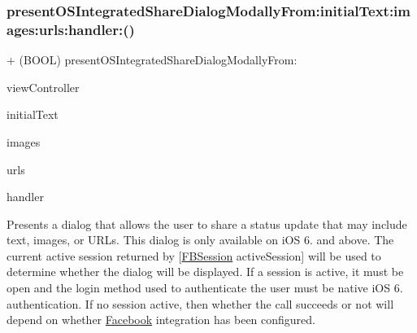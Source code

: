 \subsubsection{\texorpdfstring{present\+O\+S\+Integrated\+Share\+Dialog\+Modally\+From\+:initial\+Text\+:images\+:urls\+:handler\+:()}{presentOSIntegratedShareDialogModallyFrom:initialText:images:urls:handler:()}\hspace{0.1cm}{\footnotesize\ttfamily [2/5]}}
{\footnotesize\ttfamily + (B\+O\+OL) present\+O\+S\+Integrated\+Share\+Dialog\+Modally\+From\+: \begin{DoxyParamCaption}\item[{(U\+I\+View\+Controller $\ast$)}]{view\+Controller }\item[{initialText:(N\+S\+String $\ast$)}]{initial\+Text }\item[{images:(N\+S\+Array $\ast$)}]{images }\item[{urls:(N\+S\+Array $\ast$)}]{urls }\item[{handler:(F\+B\+O\+S\+Integrated\+Share\+Dialog\+Handler)}]{handler }\end{DoxyParamCaption}}

Presents a dialog that allows the user to share a status update that may include text, images, or U\+R\+Ls. This dialog is only available on i\+OS 6. and above. The current active session returned by \mbox{[}\hyperlink{interfaceFBSession}{F\+B\+Session} active\+Session\mbox{]} will be used to determine whether the dialog will be displayed. If a session is active, it must be open and the login method used to authenticate the user must be native i\+OS 6. authentication. If no session active, then whether the call succeeds or not will depend on whether \hyperlink{interfaceFacebook}{Facebook} integration has been configured.


